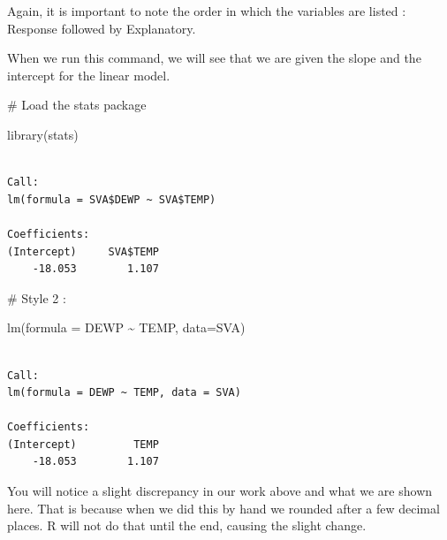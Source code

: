 \documentclass[
  letterpaper,
  DIV=11,
  numbers=noendperiod]{scrreprt}
\newenvironment{Shaded}{\begin{snugshade}}{\end{snugshade}}
\newcommand{\AttributeTok}[1]{\textcolor[rgb]{0.40,0.45,0.13}{#1}}
\newcommand{\CommentTok}[1]{\textcolor[rgb]{0.37,0.37,0.37}{#1}}
\newcommand{\FunctionTok}[1]{\textcolor[rgb]{0.28,0.35,0.67}{#1}}
\newcommand{\NormalTok}[1]{\textcolor[rgb]{0.00,0.23,0.31}{#1}}
\newcommand{\SpecialCharTok}[1]{\textcolor[rgb]{0.37,0.37,0.37}{#1}}
\begin{document}
Again, it is important to note the order in which the variables are
listed : Response followed by Explanatory.

When we run this command, we will see that we are given the slope and
the intercept for the linear model.

\begin{Shaded}
\begin{Highlighting}[]
\CommentTok{\# Load the stats package}

\FunctionTok{library}\NormalTok{(stats)}
\end{Highlighting}
\end{Shaded}

\begin{Shaded}
\end{Shaded}

\begin{verbatim}

Call:
lm(formula = SVA$DEWP ~ SVA$TEMP)

Coefficients:
(Intercept)     SVA$TEMP  
    -18.053        1.107  
\end{verbatim}

\begin{Shaded}
\begin{Highlighting}[]
\CommentTok{\# Style 2 : }

\FunctionTok{lm}\NormalTok{(}\AttributeTok{formula =}\NormalTok{ DEWP }\SpecialCharTok{\textasciitilde{}}\NormalTok{ TEMP, }\AttributeTok{data=}\NormalTok{SVA)}
\end{Highlighting}
\end{Shaded}

\begin{verbatim}

Call:
lm(formula = DEWP ~ TEMP, data = SVA)

Coefficients:
(Intercept)         TEMP  
    -18.053        1.107  
\end{verbatim}

You will notice a slight discrepancy in our work above and what we are
shown here. That is because when we did this by hand we rounded after a
few decimal places. R will not do that until the end, causing the slight
change.
\end{document}
